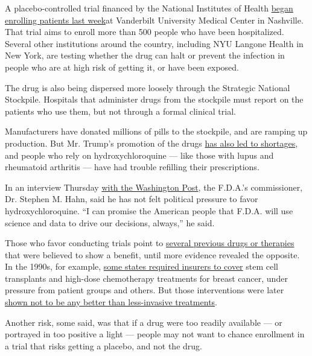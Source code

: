A placebo-controlled trial financed by the National Institutes of Health
\href{https://www.nih.gov/news-events/news-releases/nih-clinical-trial-hydroxychloroquine-potential-therapy-covid-19-begins}{began
enrolling patients last week}at Vanderbilt University Medical Center in
Nashville. That trial aims to enroll more than 500 people who have been
hospitalized. Several other institutions around the country, including
NYU Langone Health in New York, are testing whether the drug can halt or
prevent the infection in people who are at high risk of getting it, or
have been exposed.

The drug is also being dispersed more loosely through the Strategic
National Stockpile. Hospitals that administer drugs from the stockpile
must report on the patients who use them, but not through a formal
clinical trial.

Manufacturers have donated millions of pills to the stockpile, and are
ramping up production. But Mr. Trump's promotion of the drugs
\href{https://www.nytimes.com/2020/03/20/health/coronavirus-chloroquine-trump.html}{has
also led to shortages}, and people who rely on hydroxychloroquine ---
like those with lupus and rheumatoid arthritis --- have had trouble
refilling their prescriptions.

In an interview Thursday
\href{https://www.washingtonpost.com/washington-post-live/2020/04/16/transcript-confronting-covid-19/}{with
the Washington Post}, the F.D.A.'s commissioner, Dr. Stephen M. Hahn,
said he has not felt political pressure to favor hydroxychloroquine. ``I
can promise the American people that F.D.A. will use science and data to
drive our decisions, always,'' he said.

Those who favor conducting trials point to
\href{https://www.bloomberg.com/news/articles/2019-05-30/too-many-medicines-simply-don-t-work}{several
previous drugs or therapies} that were believed to show a benefit, until
more evidence revealed the opposite. In the 1990s, for example,
\href{https://www.cancernetwork.com/breast-cancer/health-insurance-coverage-autologous-bone-marrow-transplantation-breast-cancer}{some
states required insurers to cover} stem cell transplants and high-dose
chemotherapy treatments for breast cancer, under pressure from patient
groups and others. But those interventions were later
\href{https://www.ncbi.nlm.nih.gov/pmc/articles/PMC3393031/}{shown not
to be any better than less-invasive treatments}.

Another risk, some said, was that if a drug were too readily available
--- or portrayed in too positive a light --- people may not want to
chance enrollment in a trial that risks getting a placebo, and not the
drug.

